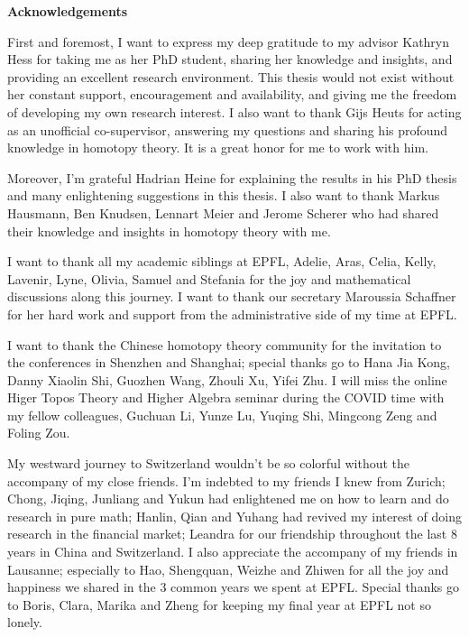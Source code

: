 \newenvironment{acknowledgements}%
    {\cleardoublepage\thispagestyle{empty}\null\vfill\begin{center}%
    \bfseries Acknowledgements\end{center}}%
    {\vfill\null}
        \begin{acknowledgements}
        
        First and foremost, I want to express my deep gratitude to my advisor Kathryn Hess for taking me as her PhD student, sharing her knowledge and insights, and providing an excellent research environment.
        This thesis would not exist without her constant support, encouragement and availability, and giving me the freedom of developing my own research interest.
        I also want to thank Gijs Heuts for acting as an unofficial co-supervisor, answering my questions and sharing his profound knowledge in homotopy theory.
        It is a great honor for me to work with him.
        
        Moreover, I'm grateful Hadrian Heine for explaining the results in his PhD thesis and many enlightening suggestions in this thesis. I also want to thank Markus Hausmann, Ben Knudsen, Lennart Meier and Jerome Scherer who had shared their knowledge and insights in homotopy theory with me.
        
        I want to thank all my academic siblings at EPFL, Adelie, Aras, Celia, Kelly, Lavenir, Lyne, Olivia, Samuel and Stefania for the joy and mathematical discussions along this journey.
        I want to thank our secretary Maroussia Schaffner for her hard work and support from the administrative side of my time at EPFL.
        
        I want to thank the Chinese homotopy theory community for the invitation to the conferences in Shenzhen and Shanghai; special thanks go to Hana Jia Kong,
        Danny Xiaolin Shi, Guozhen Wang, Zhouli Xu, Yifei Zhu. 
        I will miss the online Higer Topos Theory and Higher Algebra seminar during the COVID time with my fellow colleagues, Guchuan Li, Yunze Lu, Yuqing Shi, Mingcong Zeng and Foling Zou.
        
        My westward journey to Switzerland wouldn't be so colorful without the accompany of my close friends. I'm indebted to my friends I knew from Zurich; Chong, Jiqing, Junliang and Yukun had enlightened me on how to learn and do research in pure math;
        Hanlin, Qian and Yuhang had revived my interest of doing research in the financial market;
        Leandra for our friendship throughout the last 8 years in China and Switzerland.
        I also appreciate the accompany of my friends in Lausanne; especially to Hao, Shengquan, Weizhe and Zhiwen for all the joy and happiness we shared in the 3 common years we spent at EPFL.
        Special thanks go to Boris, Clara, Marika and Zheng for keeping my final year at EPFL not so lonely.
        

\end{acknowledgements}
